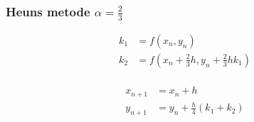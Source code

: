 %
%
\begin{frame}
\frametitle{Heuns metode $\alpha = \frac{2}{3}$ }
\begin{minipage}[t]{0.31\textwidth}
\begin{align*}
k_1 & = f(x_n , y_n) \\
k_2 & = f \left( x_n + \frac{2}{3} h , y_n  + \frac{2}{3} h k_1 \right) \\
\end{align*}
%
\end{minipage} 
\phantom{Hej}
\begin{minipage}[t]{0.31\textwidth}
\begin{align*}
x_{n+1} & = x_n+h \\
y_{n+1} & = y_n + \frac{h}{4} (k_1 + k_2 )  \\
\end{align*}
%
\end{minipage} 
\\

\\
\phantom{H}
\\
\end{frame}